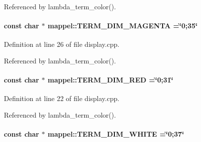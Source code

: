 Referenced by lambda\+\_\+term\+\_\+color().

\paragraph[{\texorpdfstring{T\+E\+R\+M\+\_\+\+D\+I\+M\+\_\+\+M\+A\+G\+E\+N\+TA}{TERM_DIM_MAGENTA}}]{\setlength{\rightskip}{0pt plus 5cm}const char $\ast$ mappel\+::\+T\+E\+R\+M\+\_\+\+D\+I\+M\+\_\+\+M\+A\+G\+E\+N\+TA =\char`\"{}0;35\char`\"{}}\hypertarget{namespacemappel_add36264e8025d4db88e03897ecda89b5}{}\label{namespacemappel_add36264e8025d4db88e03897ecda89b5}


Definition at line 26 of file display.\+cpp.



Referenced by lambda\+\_\+term\+\_\+color().

\paragraph[{\texorpdfstring{T\+E\+R\+M\+\_\+\+D\+I\+M\+\_\+\+R\+ED}{TERM_DIM_RED}}]{\setlength{\rightskip}{0pt plus 5cm}const char $\ast$ mappel\+::\+T\+E\+R\+M\+\_\+\+D\+I\+M\+\_\+\+R\+ED =\char`\"{}0;31\char`\"{}}\hypertarget{namespacemappel_ad0396f6c4c69571a8d774588bfd6a1bd}{}\label{namespacemappel_ad0396f6c4c69571a8d774588bfd6a1bd}


Definition at line 22 of file display.\+cpp.



Referenced by lambda\+\_\+term\+\_\+color().

\paragraph[{\texorpdfstring{T\+E\+R\+M\+\_\+\+D\+I\+M\+\_\+\+W\+H\+I\+TE}{TERM_DIM_WHITE}}]{\setlength{\rightskip}{0pt plus 5cm}const char $\ast$ mappel\+::\+T\+E\+R\+M\+\_\+\+D\+I\+M\+\_\+\+W\+H\+I\+TE =\char`\"{}0;37\char`\"{}}\hypertarget{namespacemappel_a15d16c02d9b595b272213768978e691b}{}\label{namespacemappel_a15d16c02d9b595b272213768978e691b}


